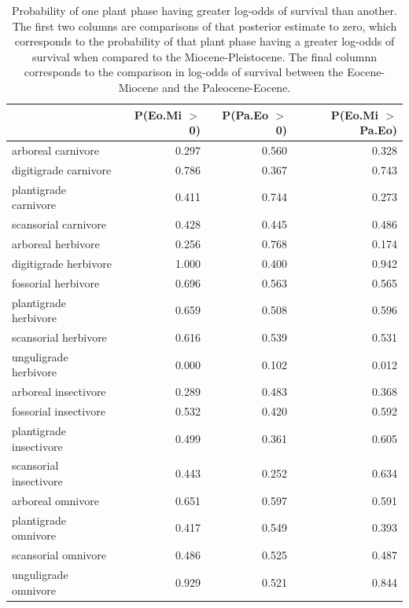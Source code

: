 \documentclass[12pt,letterpaper]{article}
\begin{document}
\begin{table}[ht]
  \centering
  \caption[Posterior probablity estimates of differences in survival by plant phase]{Probability of one plant phase having greater log-odds of survival than another. The first two columns are comparisons of that posterior estimate to zero, which corresponds to the probability of that plant phase having a greater log-odds of survival when compared to the Miocene-Pleistocene. The final columnn corresponds to the comparison in log-odds of survival between the Eocene-Miocene and the Paleocene-Eocene.} 
  \label{tab:surv_plant}
  \begin{tabular}{ l r r r }
    \hline
    & P(Eo.Mi $>$ 0) & P(Pa.Eo $>$ 0) & P(Eo.Mi $>$ Pa.Eo) \\ 
    \hline
    arboreal carnivore & 0.297 & 0.560 & 0.328 \\ 
    digitigrade carnivore & 0.786 & 0.367 & 0.743 \\ 
    plantigrade carnivore & 0.411 & 0.744 & 0.273 \\ 
    scansorial carnivore & 0.428 & 0.445 & 0.486 \\ 
    arboreal herbivore & 0.256 & 0.768 & 0.174 \\ 
    digitigrade herbivore & 1.000 & 0.400 & 0.942 \\ 
    fossorial herbivore & 0.696 & 0.563 & 0.565 \\ 
    plantigrade herbivore & 0.659 & 0.508 & 0.596 \\ 
    scansorial herbivore & 0.616 & 0.539 & 0.531 \\ 
    unguligrade herbivore & 0.000 & 0.102 & 0.012 \\ 
    arboreal insectivore & 0.289 & 0.483 & 0.368 \\ 
    fossorial insectivore & 0.532 & 0.420 & 0.592 \\ 
    plantigrade insectivore & 0.499 & 0.361 & 0.605 \\ 
    scansorial insectivore & 0.443 & 0.252 & 0.634 \\ 
    arboreal omnivore & 0.651 & 0.597 & 0.591 \\ 
    plantigrade omnivore & 0.417 & 0.549 & 0.393 \\ 
    scansorial omnivore & 0.486 & 0.525 & 0.487 \\ 
    unguligrade omnivore & 0.929 & 0.521 & 0.844 \\ 
    \hline
  \end{tabular}
\end{table}
\end{document}
